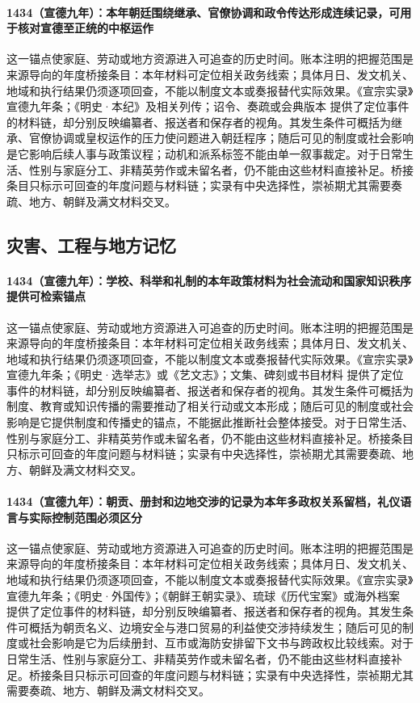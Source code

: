 \paragraph{1434（宣德九年）：本年朝廷围绕继承、官僚协调和政令传达形成连续记录，可用于核对宣德至正统的中枢运作} 这一锚点使家庭、劳动或地方资源进入可追查的历史时间。账本注明的把握范围是来源导向的年度桥接条目：本年材料可定位相关政务线索；具体月日、发文机关、地域和执行结果仍须逐项回查，不能以制度文本或奏报替代实际效果。《宣宗实录》宣德九年条；《明史·本纪》及相关列传；诏令、奏疏或会典版本 提供了定位事件的材料链，却分别反映编纂者、报送者和保存者的视角。其发生条件可概括为继承、官僚协调或皇权运作的压力使问题进入朝廷程序；随后可见的制度或社会影响是它影响后续人事与政策议程；动机和派系标签不能由单一叙事裁定。对于日常生活、性别与家庭分工、非精英劳作或未留名者，仍不能由这些材料直接补足。桥接条目只标示可回查的年度问题与材料链；实录有中央选择性，崇祯期尤其需要奏疏、地方、朝鲜及满文材料交叉。

\subsection{灾害、工程与地方记忆}

\paragraph{1434（宣德九年）：学校、科举和礼制的本年政策材料为社会流动和国家知识秩序提供可检索锚点} 这一锚点使家庭、劳动或地方资源进入可追查的历史时间。账本注明的把握范围是来源导向的年度桥接条目：本年材料可定位相关政务线索；具体月日、发文机关、地域和执行结果仍须逐项回查，不能以制度文本或奏报替代实际效果。《宣宗实录》宣德九年条；《明史·选举志》或《艺文志》；文集、碑刻或书目材料 提供了定位事件的材料链，却分别反映编纂者、报送者和保存者的视角。其发生条件可概括为制度、教育或知识传播的需要推动了相关行动或文本形成；随后可见的制度或社会影响是它提供制度和传播史的锚点，不能据此推断社会整体接受。对于日常生活、性别与家庭分工、非精英劳作或未留名者，仍不能由这些材料直接补足。桥接条目只标示可回查的年度问题与材料链；实录有中央选择性，崇祯期尤其需要奏疏、地方、朝鲜及满文材料交叉。

\paragraph{1434（宣德九年）：朝贡、册封和边地交涉的记录为本年多政权关系留档，礼仪语言与实际控制范围必须区分} 这一锚点使家庭、劳动或地方资源进入可追查的历史时间。账本注明的把握范围是来源导向的年度桥接条目：本年材料可定位相关政务线索；具体月日、发文机关、地域和执行结果仍须逐项回查，不能以制度文本或奏报替代实际效果。《宣宗实录》宣德九年条；《明史·外国传》；《朝鲜王朝实录》、琉球《历代宝案》或海外档案 提供了定位事件的材料链，却分别反映编纂者、报送者和保存者的视角。其发生条件可概括为朝贡名义、边境安全与港口贸易的利益使交涉持续发生；随后可见的制度或社会影响是它为后续册封、互市或海防安排留下文书与跨政权比较线索。对于日常生活、性别与家庭分工、非精英劳作或未留名者，仍不能由这些材料直接补足。桥接条目只标示可回查的年度问题与材料链；实录有中央选择性，崇祯期尤其需要奏疏、地方、朝鲜及满文材料交叉。

